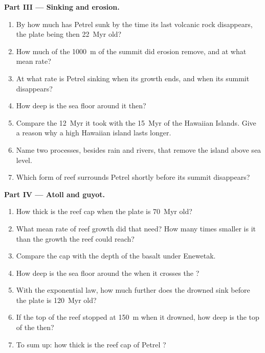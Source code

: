 \begin{problem}
\noindent\textbf{Part III --- Sinking and erosion.}
\begin{enumerate}[resume]
  \item By how much has Petrel sunk by the time its last volcanic rock disappears, the plate being
        then \qty{22}{Myr} old?
  \item How much of the \qty{1000}{m} of the summit did erosion remove, and at what mean rate?
  \item At what rate is Petrel sinking when its growth ends, and when its summit disappears?
  \item How deep is the sea floor around it then?
  \item Compare the \qty{12}{Myr} it took with the \qty{15}{Myr} of the Hawaiian Islands. Give a
        reason why a high Hawaiian island lasts longer.
  \item Name two processes, besides rain and rivers, that remove the island above sea level.
  \item Which form of reef surrounds Petrel shortly before its summit disappears?
\end{enumerate}

\noindent\textbf{Part IV --- Atoll and guyot.}
\begin{enumerate}[resume]
  \item How thick is the reef cap when the plate is \qty{70}{Myr} old?
  \item What mean rate of reef growth did that need? How many times smaller is it than the growth
        the reef could reach?
  \item Compare the cap with the depth of the basalt under Enewetak.
  \item How deep is the sea floor around the  when it crosses the ?
  \item With the exponential law, how much further does the drowned  sink before the plate is
        \qty{120}{Myr} old?
  \item If the top of the reef stopped at \qty{150}{m} when it drowned, how deep is the top of the
         then?
  \item To sum up: how thick is the reef cap of Petrel ?
\end{enumerate}
\end{problem}

